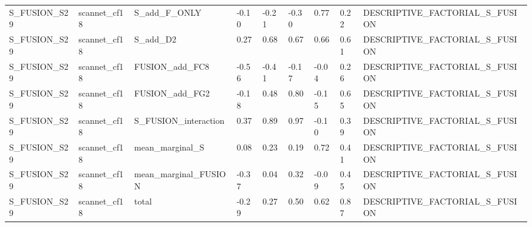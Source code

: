 \begin{tabular}{lllllllll}
S\_FUSION\_S29 & scannet\_cf18 & S\_add\_F\_ONLY & -0.10 & -0.21 & -0.30 & 0.77 & 0.22 & DESCRIPTIVE\_FACTORIAL\_S\_FUSION \\
S\_FUSION\_S29 & scannet\_cf18 & S\_add\_D2 & 0.27 & 0.68 & 0.67 & 0.66 & 0.61 & DESCRIPTIVE\_FACTORIAL\_S\_FUSION \\
S\_FUSION\_S29 & scannet\_cf18 & FUSION\_add\_FC8 & -0.56 & -0.41 & -0.17 & -0.04 & 0.26 & DESCRIPTIVE\_FACTORIAL\_S\_FUSION \\
S\_FUSION\_S29 & scannet\_cf18 & FUSION\_add\_FG2 & -0.18 & 0.48 & 0.80 & -0.15 & 0.65 & DESCRIPTIVE\_FACTORIAL\_S\_FUSION \\
S\_FUSION\_S29 & scannet\_cf18 & S\_FUSION\_interaction & 0.37 & 0.89 & 0.97 & -0.10 & 0.39 & DESCRIPTIVE\_FACTORIAL\_S\_FUSION \\
S\_FUSION\_S29 & scannet\_cf18 & mean\_marginal\_S & 0.08 & 0.23 & 0.19 & 0.72 & 0.41 & DESCRIPTIVE\_FACTORIAL\_S\_FUSION \\
S\_FUSION\_S29 & scannet\_cf18 & mean\_marginal\_FUSION & -0.37 & 0.04 & 0.32 & -0.09 & 0.45 & DESCRIPTIVE\_FACTORIAL\_S\_FUSION \\
S\_FUSION\_S29 & scannet\_cf18 & total & -0.29 & 0.27 & 0.50 & 0.62 & 0.87 & DESCRIPTIVE\_FACTORIAL\_S\_FUSION \\
\bottomrule
\end{tabular}

